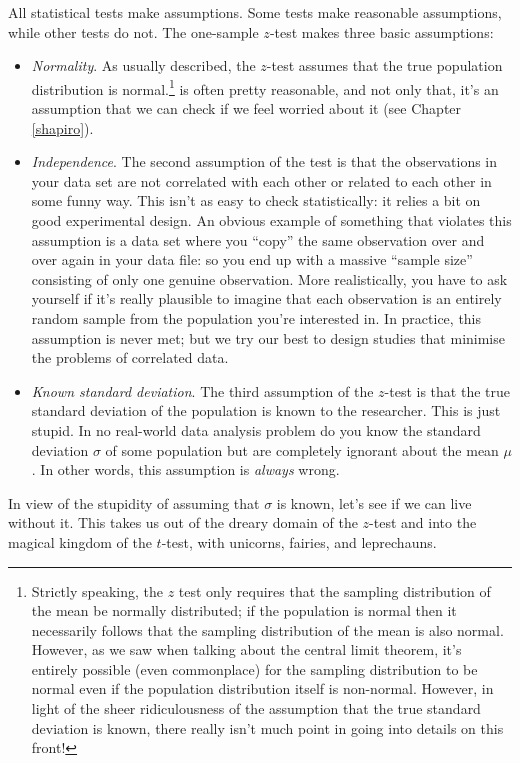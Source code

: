 \documentclass[
  11pt,
  a4paper,
  twoside,symmetric,openright]{book}
\providecommand{\tightlist}{%
  \setlength{\itemsep}{0pt}\setlength{\parskip}{0pt}}
\theoremstyle{break}
\theoremstyle{break}
\begin{document}
All statistical tests make assumptions. Some tests make reasonable assumptions, while other tests do not. The one-sample \(z\)-test makes three basic assumptions:

\begin{itemize}
\tightlist
\item
  \emph{Normality}. As usually described, the \(z\)-test assumes that the true population distribution is normal.\footnote{Strictly speaking, the \(z\) test only requires that the sampling distribution of the mean be normally distributed; if the population is normal then it necessarily follows that the sampling distribution of the mean is also normal. However, as we saw when talking about the central limit theorem, it's entirely possible (even commonplace) for the sampling distribution to be normal even if the population distribution itself is non-normal. However, in light of the sheer ridiculousness of the assumption that the true standard deviation is known, there really isn't much point in going into details on this front!} is often pretty reasonable, and not only that, it's an assumption that we can check if we feel worried about it (see Chapter \ref{shapiro}).
\item
  \emph{Independence}. The second assumption of the test is that the observations in your data set are not correlated with each other or related to each other in some funny way. This isn't as easy to check statistically: it relies a bit on good experimental design. An obvious example of something that violates this assumption is a data set where you ``copy'' the same observation over and over again in your data file: so you end up with a massive ``sample size'' consisting of only one genuine observation. More realistically, you have to ask yourself if it's really plausible to imagine that each observation is an entirely random sample from the population you're interested in. In practice, this assumption is never met; but we try our best to design studies that minimise the problems of correlated data.
\item
  \emph{Known standard deviation}. The third assumption of the \(z\)-test is that the true standard deviation of the population is known to the researcher. This is just stupid. In no real-world data analysis problem do you know the standard deviation \(\sigma\) of some population but are completely ignorant about the mean \(\mu\). In other words, this assumption is \emph{always} wrong.
\end{itemize}

In view of the stupidity of assuming that \(\sigma\) is known, let's see if we can live without it. This takes us out of the dreary domain of the \(z\)-test and into the magical kingdom of the \(t\)-test, with unicorns, fairies, and leprechauns.
\end{document}
